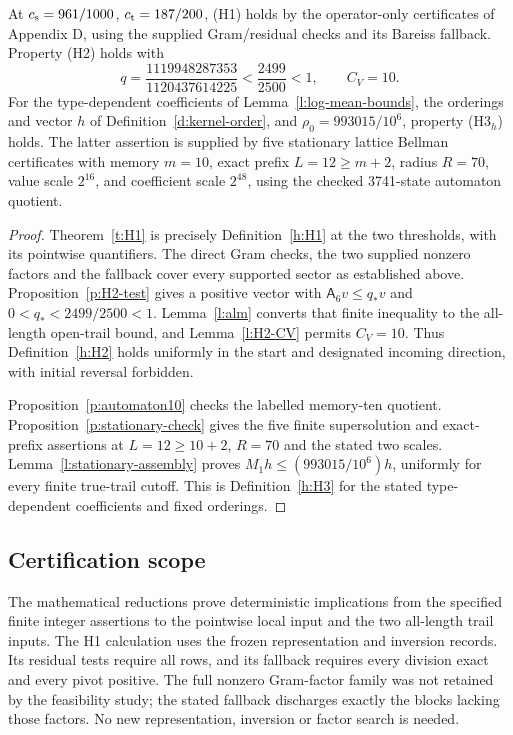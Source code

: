 \begin{theorem}\label{t:inputs}
At \(c_{\rm s}=961/1000\), \(c_{\rm t}=187/200\), (H1) holds
by the operator-only certificates of Appendix D, using the supplied
Gram/residual checks and its Bareiss fallback.
Property (H2) holds with
\[
 q=\frac{1119948287353}{1120437614225}<\frac{2499}{2500}<1,
 \qquad C_V=10 .
\]
For the type-dependent coefficients of Lemma~\ref{l:log-mean-bounds},
the orderings and vector \(h\) of Definition~\ref{d:kernel-order},
and \(\rho_0=993015/10^6\), property (H3\(_h\)) holds.
The latter assertion is supplied by five stationary lattice Bellman
certificates with memory \(m=10\), exact prefix \(L=12\ge m+2\),
radius \(R=70\), value scale \(2^{16}\), and coefficient scale
\(2^{48}\), using the checked 3741-state automaton quotient.
\end{theorem}

\begin{proof}
Theorem~\ref{t:H1} is precisely Definition~\ref{h:H1} at the two
thresholds, with its pointwise quantifiers. The direct Gram checks,
the two supplied nonzero factors and the fallback cover every
supported sector as established above.
Proposition~\ref{p:H2-test} gives a positive vector with
\(\mathsf A_6v\le q_*v\) and \(0<q_*<2499/2500<1\).
Lemma~\ref{l:alm} converts that finite inequality to the all-length
open-trail bound, and Lemma~\ref{l:H2-CV} permits \(C_V=10\).
Thus Definition~\ref{h:H2} holds uniformly in the start and
designated incoming direction, with initial reversal forbidden.

Proposition~\ref{p:automaton10} checks the labelled memory-ten
quotient. Proposition~\ref{p:stationary-check} gives the five
finite supersolution and exact-prefix assertions at
\(L=12\ge10+2\), \(R=70\) and the stated two scales.
Lemma~\ref{l:stationary-assembly} proves
\(M_1h\le(993015/10^6)h\), uniformly for every finite
true-trail cutoff. This is Definition~\ref{h:H3} for the stated
type-dependent coefficients and fixed orderings.
\end{proof}

\subsection*{Certification scope}
The mathematical reductions prove deterministic implications from
the specified finite integer assertions to the pointwise local
input and the two all-length trail inputs. The H1 calculation uses
the frozen representation and inversion records. Its residual
tests require all rows, and its fallback requires every division
exact and every pivot positive. The full nonzero Gram-factor
family was not retained by the feasibility study; the stated
fallback discharges exactly the blocks lacking those factors.
No new representation, inversion or factor search is needed.


